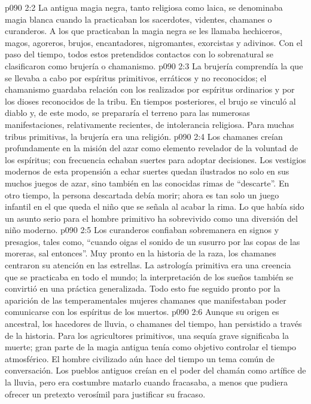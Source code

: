 \vs p090 2:2 La antigua magia negra, tanto religiosa como laica, se denominaba magia blanca cuando la practicaban los sacerdotes, videntes, chamanes o curanderos. A los que practicaban la magia negra se les llamaba hechiceros, magos, agoreros, brujos, encantadores, nigromantes, exorcistas y adivinos. Con el paso del tiempo, todos estos pretendidos contactos con lo sobrenatural se clasificaron como brujería o chamanismo.
\vs p090 2:3 La brujería comprendía la  que se llevaba a cabo por espíritus primitivos, erráticos y no reconocidos; el chamanismo guardaba relación con los  realizados por espíritus ordinarios y por los dioses reconocidos de la tribu. En tiempos posteriores, el brujo se vinculó al diablo y, de este modo, se prepararía el terreno para las numerosas manifestaciones, relativamente recientes, de intolerancia religiosa. Para muchas tribus primitivas, la brujería era una religión.
\vs p090 2:4 Los chamanes creían profundamente en la misión del azar como elemento revelador de la voluntad de los espíritus; con frecuencia echaban suertes para adoptar decisiones. Los vestigios modernos de esta propensión a echar suertes quedan ilustrados no solo en sus muchos juegos de azar, sino también en las conocidas rimas de “descarte”. En otro tiempo, la persona descartada debía morir; ahora es tan solo un juego infantil en el que queda  el niño que se señala al acabar la rima. Lo que había sido un asunto serio para el hombre primitivo ha sobrevivido como una diversión del niño moderno.
\vs p090 2:5 Los curanderos confiaban sobremanera en signos y presagios, tales como, “cuando oigas el sonido de un susurro por las copas de las moreras, sal entonces”. Muy pronto en la historia de la raza, los chamanes centraron su atención en las estrellas. La astrología primitiva era una creencia que se practicaba en todo el mundo; la interpretación de los sueños también se convirtió en una práctica generalizada. Todo esto fue seguido pronto por la aparición de las temperamentales mujeres chamanes que manifestaban poder comunicarse con los espíritus de los muertos.
\vs p090 2:6 Aunque su origen es ancestral, los hacedores de lluvia, o chamanes del tiempo, han persistido a través de la historia. Para los agricultores primitivos, una sequía grave significaba la muerte; gran parte de la magia antigua tenía como objetivo controlar el tiempo atmosférico. El hombre civilizado aún hace del tiempo un tema común de conversación. Los pueblos antiguos creían en el poder del chamán como artífice de la lluvia, pero era costumbre matarlo cuando fracasaba, a menos que pudiera ofrecer un pretexto verosímil para justificar su fracaso.
